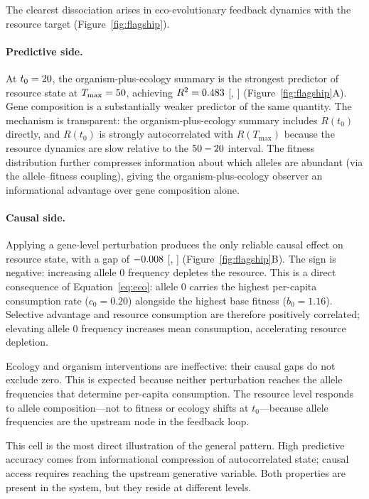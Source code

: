 \documentclass[11pt,a4paper]{article}
\newcommand{\Tfin}{T_{\max}}
\begin{document}
The clearest dissociation arises in eco-evolutionary feedback dynamics
with the resource target (Figure~\ref{fig:flagship}).

\paragraph{Predictive side.}
At $t_0 = 20$, the organism-plus-ecology summary is the strongest
predictor of resource state at $\Tfin = \Tmax$,
achieving $R^2 = 0.483{}$ [\FlagPredLo{}, \FlagPredHi{}]
(Figure~\ref{fig:flagship}A).
Gene composition is a substantially weaker predictor of the same quantity.
The mechanism is transparent: the organism-plus-ecology summary includes
$R(t_0)$ directly, and $R(t_0)$ is strongly autocorrelated with $R(\Tfin)$
because the resource dynamics are slow relative to the $50 - 20$
interval.
The fitness distribution further compresses information about which alleles
are abundant (via the allele--fitness coupling), giving the organism-plus-ecology
observer an informational advantage over gene composition alone.

\paragraph{Causal side.}
Applying a gene-level perturbation produces the only reliable causal effect
on resource state, with a gap of $-0.008{}$ [\FlagCausLo{}, \FlagCausHi{}]
(Figure~\ref{fig:flagship}B).
The sign is negative: increasing allele 0 frequency depletes the resource.
This is a direct consequence of Equation~\eqref{eq:eco}: allele 0 carries
the highest per-capita consumption rate ($c_0 = 0.20$) alongside the
highest base fitness ($b_0 = 1.16$).
Selective advantage and resource consumption are therefore positively
correlated; elevating allele 0 frequency increases mean consumption,
accelerating resource depletion.

Ecology and organism interventions are ineffective: their causal gaps
do not exclude zero.
This is expected because neither perturbation reaches the allele frequencies
that determine per-capita consumption.
The resource level responds to allele composition---not to fitness or ecology
shifts at $t_0$---because allele frequencies are the upstream node in the
feedback loop.

This cell is the most direct illustration of the general pattern.
High predictive accuracy comes from informational compression of autocorrelated
state; causal access requires reaching the upstream generative variable.
Both properties are present in the system, but they reside at different levels.
\end{document}

